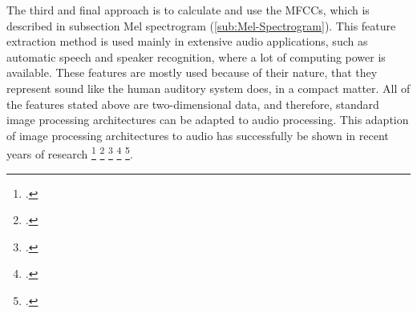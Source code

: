 \newline
\newline
The third and final approach is to calculate and use the \glspl{MFCC}, which is described in subsection Mel spectrogram (\ref{sub:Mel-Spectrogram}). This feature extraction method is used mainly in extensive audio applications, such as automatic speech and speaker recognition, where a lot of computing power is available. These features are mostly used because of their nature, that they represent sound like the human auditory system does, in a compact matter.
\newline
\newline
All of the features stated above are two-dimensional data, and therefore, standard image processing architectures can be adapted to audio processing. This adaption of image processing architectures to audio has successfully be shown in recent years of research \footcite{dai_acoustic_2016} \footcite{takahashi_deep_2016} \footcite{purwins_deep_2019} \footcite{lee_samplecnn_2018} \footcite{pons_timbre_2017}. 


